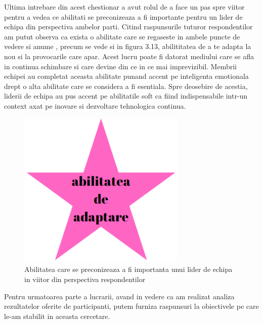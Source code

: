 \documentclass[a4paper, 12pt]{article}
\begin{document}
	\quad Ultima intrebare din acest chestionar a avut rolul de a face un pas spre viitor pentru a vedea ce abilitati se preconizeaza a fi importante  pentru un lider de echipa din perspectiva ambelor parti. Citind raspunsurile tuturor respondentilor am putut observa ca exista o abilitate care se regaseste in ambele puncte de vedere si anume , precum se vede si in figura 3.13, abilititatea de a te adapta la nou si la provocarile care apar.  Acest lucru poate fi datorat mediului care se afla in continua schimbare si care devine din ce in ce mai imprevizibil. Membrii echipei au completat aceasta abilitate punand accent pe inteligenta emotionala drept o alta abilitate care se considera a fi esentiala. Spre deosebire de acestia, liderii de echipa au pus accent pe abilitatile  soft ca fiind indispensabile intr-un context axat pe inovare si dezvoltare tehnologica continua.
	

	\quad \begin{figure}[!htb]
			\centering
			\includegraphics[width=8cm, height=6 cm]{"figures/future.png"}
			\caption {Abilitatea care se preconizeaza a fi importanta unui lider de echipa in viitor din perspectiva respondentilor}\label{fig:four}
			
		\end{figure}

	\quad Pentru urmatoarea parte a lucrarii, avand in vedere ca am realizat analiza rezultatelor oferite de participanti, putem furniza raspunsuri la obiectivele pe care le-am stabilit in aceasta cercetare.
\end{document}
